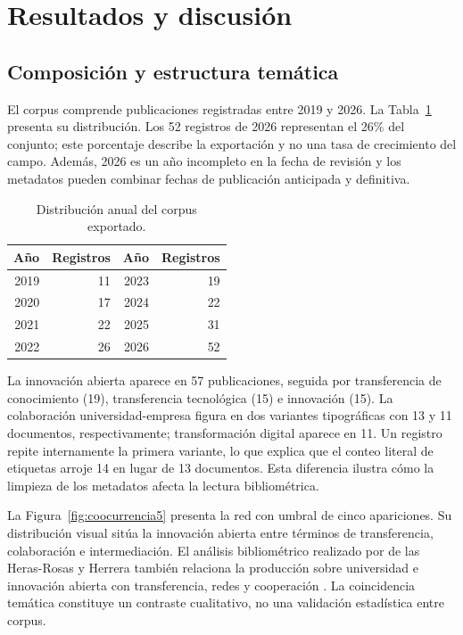 \documentclass[12pt,twocolumn]{article}
\begin{document}
\section{Resultados y discusión}
\subsection{Composición y estructura temática}
El corpus comprende publicaciones registradas entre 2019 y 2026. La Tabla~\ref{tab:corpus} presenta su distribución. Los 52 registros de 2026 representan el 26\% del conjunto; este porcentaje describe la exportación y no una tasa de crecimiento del campo. Además, 2026 es un año incompleto en la fecha de revisión y los metadatos pueden combinar fechas de publicación anticipada y definitiva.

\begin{table}[t]
\centering
\caption{Distribución anual del corpus exportado.}
\label{tab:corpus}
\begin{tabular}{@{}rrrr@{}}
\toprule
Año & Registros & Año & Registros\\
\midrule
2019 & 11 & 2023 & 19\\
2020 & 17 & 2024 & 22\\
2021 & 22 & 2025 & 31\\
2022 & 26 & 2026 & 52\\
\bottomrule
\end{tabular}
\end{table}

La innovación abierta aparece en 57 publicaciones, seguida por transferencia de conocimiento (19), transferencia tecnológica (15) e innovación (15). La colaboración universidad-empresa figura en dos variantes tipográficas con 13 y 11 documentos, respectivamente; transformación digital aparece en 11. Un registro repite internamente la primera variante, lo que explica que el conteo literal de etiquetas arroje 14 en lugar de 13 documentos. Esta diferencia ilustra cómo la limpieza de los metadatos afecta la lectura bibliométrica.

La Figura~\ref{fig:coocurrencia5} presenta la red con umbral de cinco apariciones. Su distribución visual sitúa la innovación abierta entre términos de transferencia, colaboración e intermediación. El análisis bibliométrico realizado por de las Heras-Rosas y Herrera también relaciona la producción sobre universidad e innovación abierta con transferencia, redes y cooperación \cite{delasheras2021}. La coincidencia temática constituye un contraste cualitativo, no una validación estadística entre corpus.
\end{document}
